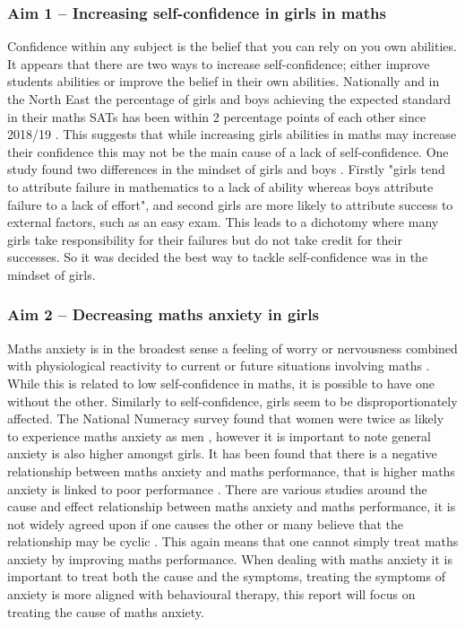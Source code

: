 \documentclass[11pt, a4paper, notitlepage]{article}
\begin{document}
\subsubsection*{Aim 1 -- Increasing self-confidence in girls in maths} 
Confidence within any subject is the belief that you can rely on you own abilities. It appears that there are two ways to increase self-confidence; either improve students abilities or improve the belief in their own abilities. Nationally and in the North East the percentage of girls and boys achieving the expected standard in their maths SATs has been within 2 percentage points of each other since 2018/19 \cite{maths_SATs_stats}. This suggests that while increasing girls abilities in maths may increase their confidence this may not be the main cause of a lack of self-confidence. One study  found two differences in the mindset of girls and boys \cite{Georgiou01122007}. Firstly "girls tend to attribute failure in mathematics to a lack of ability whereas boys attribute failure to a lack of effort", and second girls are more likely to attribute success to external factors, such as an easy exam. This leads to a dichotomy where many girls take responsibility for their failures but do not take credit for their successes. So it was decided the best way to tackle self-confidence was in the mindset of girls.
\subsubsection*{Aim 2 -- Decreasing maths anxiety in girls}
Maths anxiety is in the broadest sense a feeling of worry or nervousness combined with physiological reactivity to current or future situations involving maths \cite{Luttenberger:2018}. While this is related to low self-confidence in maths, it is possible to have one without the other. Similarly to self-confidence, girls seem to be disproportionately affected. The National Numeracy survey found that women were twice as likely to experience maths anxiety as men \cite{NationalNumeracy_anxiety}, however it is important to note general anxiety is also higher amongst girls. It has been found that there is a negative relationship between maths anxiety and maths performance, that is higher maths anxiety is linked to poor performance \cite{Chang:2016}. 
There are various studies around the cause and effect relationship between maths anxiety and maths performance, it is not widely agreed upon if one causes the other or many believe that the relationship may be cyclic \cite{Chang:2016}. This again means that one cannot simply treat maths anxiety by improving maths performance. When dealing with maths anxiety it is important to treat both the cause and the symptoms, treating the symptoms of anxiety is more aligned with behavioural therapy, this report will focus on treating the cause of maths anxiety.
\end{document}
